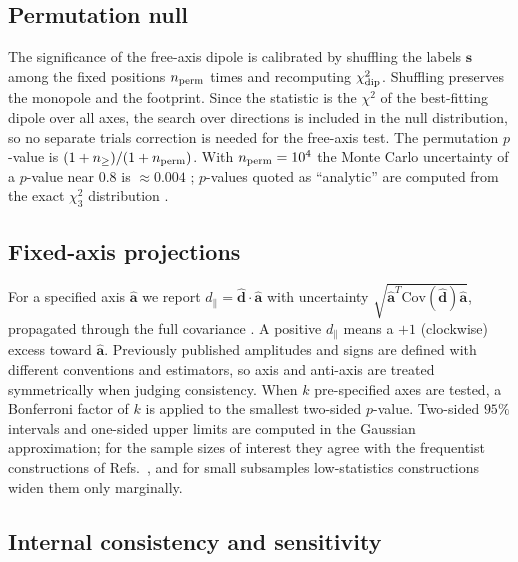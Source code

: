 \documentclass[preprint,12pt]{elsarticle}
\begin{document}
\subsection{Permutation null}
\label{sec:perm}

The significance of the free-axis dipole is calibrated by shuffling the labels $\mathbf{s}$ among the fixed positions $n_{\rm perm}$ times and recomputing $\chi^2_{\rm dip}$.
Shuffling preserves the monopole and the footprint.
Since the statistic is the $\chi^2$ of the best-fitting dipole over all axes, the search over directions is included in the null distribution, so no separate trials correction is needed for the free-axis test.
The permutation $p$-value is $(1 + n_{\ge})/(1 + n_{\rm perm})$.
With $n_{\rm perm}=10^4$ the Monte Carlo uncertainty of a $p$-value near $0.8$ is $\approx0.004$ \cite{Wolff2004}; $p$-values quoted as ``analytic'' are computed from the exact $\chi^2_3$ distribution \cite{Gil2015}.

\subsection{Fixed-axis projections}
\label{sec:proj}

For a specified axis $\hat{\mathbf{a}}$ we report $d_{\parallel} = \hat{\mathbf{d}}\cdot\hat{\mathbf{a}}$ with uncertainty $\sqrt{\hat{\mathbf{a}}^T\mathrm{Cov}(\hat{\mathbf{d}})\hat{\mathbf{a}}}$, propagated through the full covariance \cite{Ramos2019}.
A positive $d_\parallel$ means a $+1$ (clockwise) excess toward $\hat{\mathbf{a}}$.
Previously published amplitudes and signs are defined with different conventions and estimators, so axis and anti-axis are treated symmetrically when judging consistency.
When $k$ pre-specified axes are tested, a Bonferroni factor of $k$ is applied to the smallest two-sided $p$-value.
Two-sided $95\%$ intervals and one-sided upper limits are computed in the Gaussian approximation; for the sample sizes of interest they agree with the frequentist constructions of Refs.~\cite{Barlow2002,Conrad2004}, and for small subsamples low-statistics constructions \cite{Zlokazov2014} widen them only marginally.

\subsection{Internal consistency and sensitivity}
\label{sec:consistency}
\end{document}
